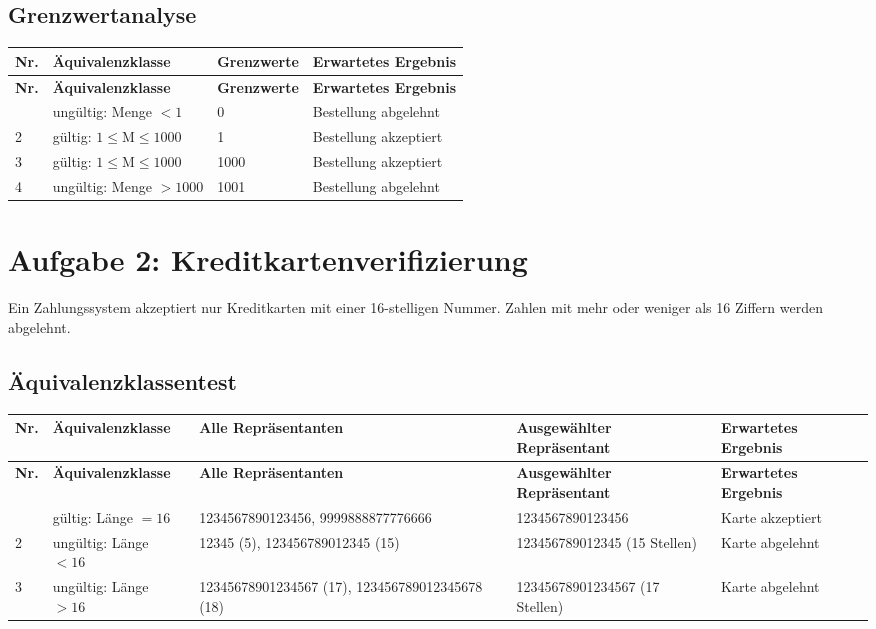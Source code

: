 \documentclass[
	fontsize=12pt,          %
	paper=a4,               %
	numbers=noenddot,       %
	listof=totoc,           %
	listof=entryprefix,     %
	listof=nochaptergap,    %
	bibliography=totoc,     %
	parskip=half,           %
	openany                 %
]{scrbook}
\begin{document}
\section*{Grenzwertanalyse}

\begin{longtable}{| p{0.5cm} | p{4.0cm} | p{4.5cm} | p{3.8cm} |}
	\hline
	\textbf{Nr.} & \textbf{Äquivalenzklasse} & \textbf{Grenzwerte} & \textbf{Erwartetes Ergebnis} \\ \hline
	\endfirsthead
	\hline
	\textbf{Nr.} & \textbf{Äquivalenzklasse} & \textbf{Grenzwerte} & \textbf{Erwartetes Ergebnis} \\ \hline
	\endhead
	\hline
	\endfoot
	1 & ungültig: Menge $< 1$ & 0 & Bestellung abgelehnt \\ \hline
	2 & gültig: $1 \leq \text{M} \leq 1000$ & 1 & Bestellung akzeptiert \\ \hline
	3 & gültig: $1 \leq \text{M} \leq 1000$ & 1000 & Bestellung akzeptiert \\ \hline
	4 & ungültig: Menge $> 1000$ & 1001 & Bestellung abgelehnt \\ \hline
\end{longtable}


\chapter*{Aufgabe 2: Kreditkartenverifizierung}

Ein Zahlungssystem akzeptiert nur Kreditkarten mit einer 16-stelligen Nummer.
Zahlen mit mehr oder weniger als 16 Ziffern werden abgelehnt.

\section*{Äquivalenzklassentest}

\begin{longtable}{| p{0.5cm} | p{3.5cm} | p{3.8cm} | p{2.5cm} | p{2.8cm} |}
	\hline
	\textbf{Nr.} & \textbf{Äquivalenzklasse} & \textbf{Alle Repräsentanten} & \textbf{Ausgewählter Repräsentant} & \textbf{Erwartetes Ergebnis} \\ \hline
	\endfirsthead
	\hline
	\textbf{Nr.} & \textbf{Äquivalenzklasse} & \textbf{Alle Repräsentanten} & \textbf{Ausgewählter Repräsentant} & \textbf{Erwartetes Ergebnis} \\ \hline
	\endhead
	\hline
	\endfoot
	1 & gültig: Länge $= 16$ & 1234567890123456, 9999888877776666 & 1234567890123456 & Karte akzeptiert \\ \hline
	2 & ungültig: Länge $< 16$ & 12345 (5), 123456789012345 (15) & 123456789012345 (15 Stellen) & Karte abgelehnt \\ \hline
	3 & ungültig: Länge $> 16$ & 12345678901234567 (17), 123456789012345678 (18) & 12345678901234567 (17 Stellen) & Karte abgelehnt \\ \hline
\end{longtable}
\end{document}
